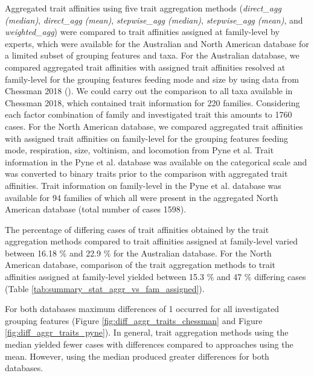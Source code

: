 \documentclass[../Draft_harmonization_paper.tex]{subfiles}
\begin{document}
Aggregated trait affinities using five trait aggregation methods (\textit{direct\_agg (median)}, \textit{direct\_agg (mean)}, \textit{stepwise\_agg (median)}, \textit{stepwise\_agg (mean)}, and \textit{weighted\_agg}) were compared to trait affinities assigned at family-level by experts, which were available for the Australian and North American database for a limited subset of grouping features and taxa. For the Australian database, we compared aggregated trait affinities with assigned trait affinities resolved at family-level for the grouping features feeding mode and size by using data from Chessman 2018 (\cite{chessman_dissolved-oxygen_2018}). We could carry out the comparison to all taxa available in Chessman 2018, which contained trait information for 220 families. Considering each factor combination of family and investigated trait this amounts to 1760 cases. For the North American database, we compared aggregated trait affinities with assigned trait affinities on family-level for the grouping features feeding mode, respiration, size, voltinism, and locomotion from Pyne et al. Trait information in the Pyne et al. database was available on the categorical scale and was converted to binary traits prior to the comparison with aggregated trait affinities. Trait information on family-level in the Pyne et al. database was available for 94 families of which all were present in the aggregated North American database (total number of cases 1598).

The percentage of differing cases of trait affinities obtained by the trait aggregation methods compared to trait affinities assigned at family-level varied between 16.18 \% and 22.9 \% for the Australian database. For the North American database, comparison of the trait aggregation methods to trait affinities assigned at family-level yielded between 15.3 \% and 47 \% differing cases (Table \ref{tab:summary_stat_aggr_vs_fam_assigned}).

For both databases maximum differences of 1 occurred for all investigated grouping features (Figure \ref{fig:diff_aggr_traits_chessman} and Figure \ref{fig:diff_aggr_traits_pyne}). In general, trait aggregation methods using the median yielded fewer cases with differences compared to approaches using the mean. However, using the median produced greater differences for both databases. 
\end{document}
